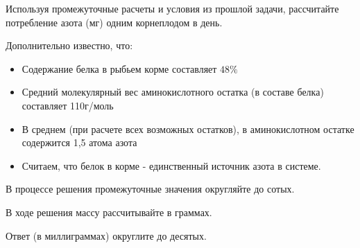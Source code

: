 
Используя промежуточные расчеты и условия из прошлой задачи, рассчитайте потребление азота (мг) одним корнеплодом в день.

Дополнительно известно, что:

\begin{itemize}
    \item Содержание белка в рыбьем корме составляет $48\%$
    \item Средний молекулярный вес аминокислотного остатка (в составе белка) составляет 110г/моль
    \item В среднем (при расчете всех возможных остатков), в аминокислотном остатке содержится 1,5 атома азота
    \item Считаем, что белок в корме - единственный источник азота в системе.
\end{itemize}

В процессе решения промежуточные значения округляйте до сотых.

В ходе решения массу рассчитывайте в граммах.

Ответ (в миллиграммах) округлите до десятых.